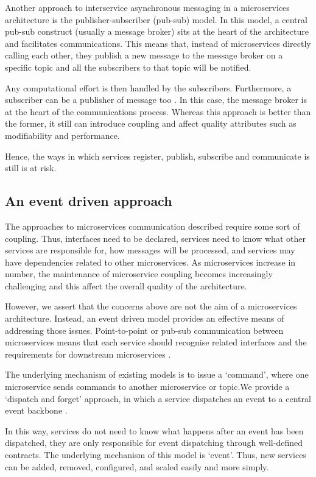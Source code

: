 \documentclass[conference]{IEEEtran}
\begin{document}
Another approach to interservice asynchronous messaging in a microservices architecture is the publisher-subscriber (pub-sub) model. In this model, a central pub-sub construct (usually a message broker) sits at the heart of the architecture and facilitates communications. This means that, instead of microservices directly calling each other, they publish a new message to the message broker on a specific topic and all the subscribers to that topic will be notified.

Any computational effort is then handled by the subscribers. Furthermore, a subscriber can be a publisher of message too \cite{Indrasiri}. In this case, the message broker is at the heart of the communications process. Whereas this approach is better than the former, it still can introduce coupling and affect quality attributes such as modifiability and performance.

Hence, the ways in which services register, publish, subscribe and communicate is still is at risk.

\subsection{An event driven approach}

The approaches to microservices communication described require some sort of coupling. Thus, interfaces need to be declared, services need to know what other services are responsible for, how messages will be processed, and services may have dependencies related to other microservices. As microservices increase in number, the maintenance of microservice coupling becomes increasingly challenging and this affect the overall quality of the architecture.

However, we assert that the concerns above are not the aim of a microservices architecture. Instead, an event driven model provides an effective means of addressing those issues. Point-to-point or pub-sub communication between microservices means that each service should recognise related interfaces and the requirements for downstream microservices \cite{Gupta,Molina}.

The underlying mechanism of existing models is to issue a ‘command’, where one microservice sends commands to another microservice or topic.We provide a ‘dispatch and forget’ approach, in which a service dispatches an event to a central event backbone \cite{Michelson}.

In this way, services do not need to know what happens after an event has been dispatched, they are only responsible for event dispatching through well-defined contracts. The underlying mechanism of this model is ‘event’. Thus, new services can be added, removed, configured, and scaled easily and more simply.
\end{document}
